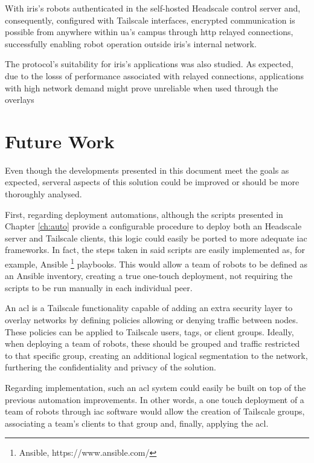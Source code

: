 \documentclass[11pt,twoside,a4paper]{report}
\begin{document}
With \ac{iris}'s robots authenticated in the self-hosted Headscale control server and, consequently, configured with Tailscale interfaces, encrypted communication is possible from anywhere within \ac{ua}'s campus through \ac{http} relayed connections, successfully enabling robot operation outside \ac{iris}'s internal network.

The protocol's suitability for \ac{iris}'s applications was also studied. As expected, due to the losss of performance associated with relayed connections, applications with high network demand might prove unreliable  when used through the overlays

\section{Future Work}

Even though the developments presented in this document meet the goals as expected, serveral aspects of this solution could be improved or should be more thoroughly analysed.

First, regarding deployment automations, although the scripts presented in Chapter \ref{ch:auto} provide a configurable procedure to deploy both an Headscale server and Tailscale clients, this logic could easily be ported to more adequate \ac{iac} frameworks. In fact, the steps taken in said scripts are easily implemented as, for example, Ansible \footnote{Ansible, https://www.ansible.com/} playbooks. This would allow a team of robots to be defined as an Ansible inventory, creating a true one-touch deployment, not requiring the scripts to be run manually in each individual peer.

An \ac{acl} is a Tailscale functionality capable of adding an extra security layer to overlay networks by defining policies allowing or denying traffic between nodes. These policies can be applied to Tailscale users, tags, or client groups. Ideally, when deploying a team of robots, these should be grouped and traffic restricted to that specific group, creating an additional logical segmentation to the network, furthering the confidentiality and privacy of the solution.

Regarding implementation, such an \ac{acl} system could easily be built on top of the previous automation improvements. In other words, a one touch deployment of a team of robots through \ac{iac} software would allow the creation of Tailscale groups, associating a team's clients to that group and, finally, applying the \ac{acl}.
\end{document}
